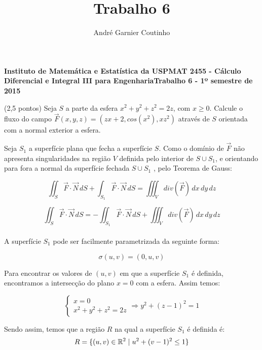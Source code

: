 \documentclass[12pt,a4paper]{article}
\title{Trabalho 6}
\author{André Garnier Coutinho}
\begin{document}
\begin{center}
\textbf{Instituto de Matemática e Estatística da USP\linebreak MAT 2455 - Cálculo Diferencial e Integral III para Engenharia\linebreak Trabalho 6 - 1º semestre de 2015}
\end{center}



 (2,5 pontos) Seja $S$ a parte da esfera $x^2 + y^2 + z^2 = 2z$, com $x \geq 0$. Calcule o fluxo do campo $\vec{F}(x,y,z) = (zx+2, cos(x^2), xz^2)$ através de $S$ orientada com a normal exterior a esfera.


Seja $S_1$ a superfície plana que fecha a superfície $S$. Como o domínio de $\vec{F} $ não apresenta singularidades na região $V$ definida pelo interior de $S \cup S_1 $, e orientando para fora a normal da superfície fechada $S \cup S_1$ , pelo Teorema de Gauss:

$$ \iint_{S} \vec{F}  \cdot \vec{N} \,dS + \int_{ S_1 } \vec{F}  \cdot \vec{N} \,dS = \iiint_{V} div(\vec{F})  \,dx \,dy \,dz $$

\begin{equation}
\iint_{S} \vec{F}  \cdot \vec{N} \,dS = - \iint_{ S_1 } \vec{F}   \cdot \vec{N} \,dS  + \iiint_{V} div(\vec{F}) \,dx \,dy \,dz
\label{eq:1}
\end{equation} \\



A superfície $S_1$ pode ser facilmente parametrizada da seguinte forma:

\[ \sigma (u,v) = (0, u, v) \] 

Para encontrar os valores de $(u,v)$ em que a superfície $S_1$ é definida, encontramos a intersecção do plano $x=0$ com a esfera. Assim temos:

$$ \begin{cases}
x = 0 \\
x^2 + y^2 + z^2 = 2z
\end{cases}
\Rightarrow y^2 + (z-1)^2 = 1
$$

Sendo assim, temos que a região $R$ na qual a superfície $S_1$ é definida é:
$$ R = \{ (u,v) \in \mathbb{R}^2 \hspace{1 mm} | \hspace{1 mm}  u^2 + (v-1)^2 \leq 1 \} $$
\end{document}
